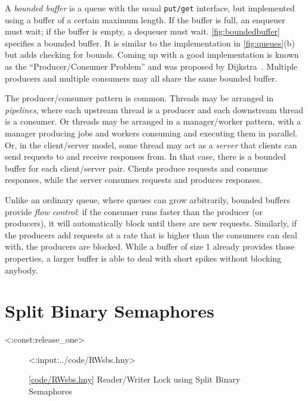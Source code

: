 \documentclass{report}
\newcommand{\harmonylink}[1]{%
[\href{https://harmony.cs.cornell.edu/#1}{\underline{#1}}]%
}
\newenvironment{code}{
\tcolorbox
}{
\endtcolorbox
}
\begin{document}
A \emph{bounded buffer} is
a queue with the usual \texttt{put/get} interface,
but implemented using a buffer
of a certain maximum length.
If the buffer is full, an enqueuer must wait; if the buffer is empty,
a dequeuer must wait.
\autoref{fig:boundedbuffer} specifies a bounded buffer.
It is similar to the implementation in \autoref{fig:queues}(b) but adds
checking for bounds.
Coming up with a good implementation is known as the
``Producer/Consumer Problem'' and was
proposed by Dijkstra~\cite{EWD329}.
Multiple producers and multiple consumers may all share
the same bounded buffer.

The producer/consumer pattern is common.  Threads may be arranged
in \emph{pipelines},
%
where each upstream thread is a producer and each downstream
thread is a consumer.
Or threads may be arranged in a manager/worker pattern, with a manager
producing jobs and workers consuming and executing them in parallel.
Or, in the client/server model,
%
some thread may act as a \emph{server} that clients can send requests to
and receive responses from.  In that case, there is a bounded buffer
for each client/server pair. Clients produce requests and
consume responses, while the server consumes requests and produces responses.

%
Unlike an ordinary queue, where queues can grow arbitrarily, bounded buffers
provide \emph{flow control}: if the consumer runs faster than the producer
(or producers), it will automatically block until there are new requests.
Similarly, if the producers add requests at a rate that is higher than the
consumers can deal with, the producers are blocked.  While a buffer of size 1
already provides those properties, a larger buffer is able to deal with short
spikes without blocking anybody.

\chapter{Split Binary Semaphores}
\label{ch:sbs}
%

<{:const:release_one}>

\begin{figure}
\begin{code}
<{:input:../code/RWsbs.hny}>
\end{code}
\caption{\harmonylink{code/RWsbs.hny} Reader/Writer Lock using Split Binary Semaphores}
\label{fig:RWsplitsema}
\end{figure}
\end{document}
